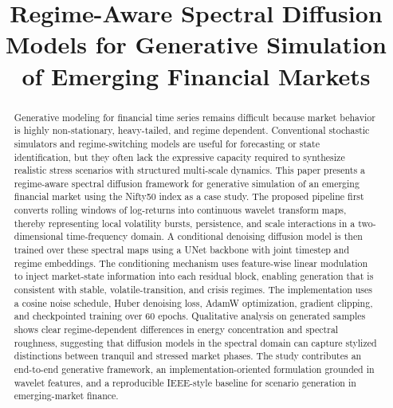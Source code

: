 \documentclass[conference]{IEEEtran}
\begin{document}
\title{Regime-Aware Spectral Diffusion Models for Generative Simulation of Emerging Financial Markets}

\author{%
    \and
}

\maketitle

\begin{abstract}
Generative modeling for financial time series remains difficult because market behavior is highly non-stationary, heavy-tailed, and regime dependent. Conventional stochastic simulators and regime-switching models are useful for forecasting or state identification, but they often lack the expressive capacity required to synthesize realistic stress scenarios with structured multi-scale dynamics. This paper presents a regime-aware spectral diffusion framework for generative simulation of an emerging financial market using the Nifty50 index as a case study. The proposed pipeline first converts rolling windows of log-returns into continuous wavelet transform maps, thereby representing local volatility bursts, persistence, and scale interactions in a two-dimensional time-frequency domain. A conditional denoising diffusion model is then trained over these spectral maps using a UNet backbone with joint timestep and regime embeddings. The conditioning mechanism uses feature-wise linear modulation to inject market-state information into each residual block, enabling generation that is consistent with stable, volatile-transition, and crisis regimes. The implementation uses a cosine noise schedule, Huber denoising loss, AdamW optimization, gradient clipping, and checkpointed training over 60 epochs. Qualitative analysis on generated samples shows clear regime-dependent differences in energy concentration and spectral roughness, suggesting that diffusion models in the spectral domain can capture stylized distinctions between tranquil and stressed market phases. The study contributes an end-to-end generative framework, an implementation-oriented formulation grounded in wavelet features, and a reproducible IEEE-style baseline for scenario generation in emerging-market finance.
\end{abstract}
\end{document}
